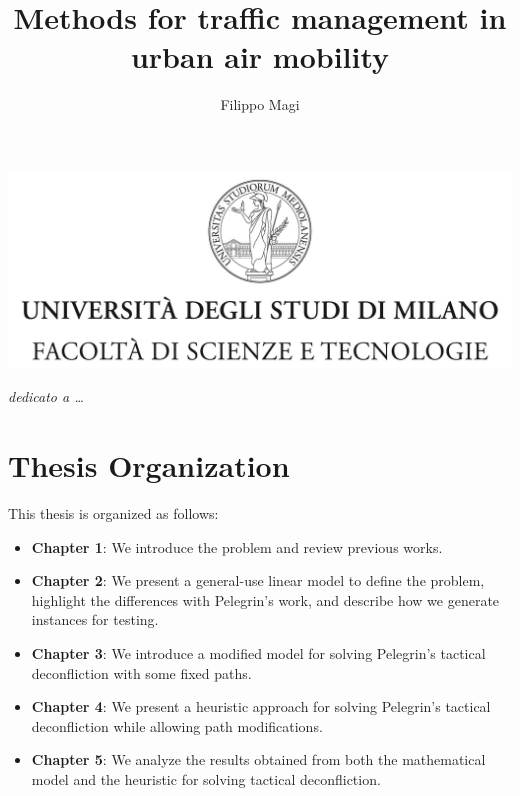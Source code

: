 \documentclass[a4paper,12pt]{report}
\begin{document}
\includegraphics[width=\textwidth]{thesis/picture/tesiSCIENZE_TECNOLOGIE.jpg}
\title{Methods for traffic management in urban air mobility}
\author{Filippo Magi}
%
% 
%
\beforepreface
\prefacesection{}
        {\hfill \Large {\sl dedicato a \dots}}
% 
%

%
%
\section*{Thesis Organization}
\label{organizzazione}

This thesis is organized as follows:
\begin{itemize}
    \item \textbf{Chapter 1}: We introduce the problem and review previous works.
    \item \textbf{Chapter 2}: We present a general-use linear model to define the problem, highlight the differences with Pelegrin's work, and describe how we generate instances for testing.
    \item \textbf{Chapter 3}: We introduce a modified model for solving Pelegrin's tactical deconfliction with some fixed paths.
    \item \textbf{Chapter 4}: We present a heuristic approach for solving Pelegrin's tactical deconfliction while allowing path modifications.
    \item \textbf{Chapter 5}: We analyze the results obtained from both the mathematical model and the heuristic for solving tactical deconfliction.
\end{itemize}
% 
% 
\end{document}
